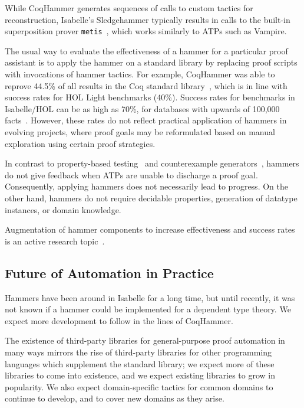 While CoqHammer generates sequences of calls to custom tactics for reconstruction, Isabelle's Sledgehammer typically results in calls to the built-in superposition prover \lstinline{metis}~\citep{Blanchette2011}, which works similarly to ATPs such as Vampire.

The usual way to evaluate the effectiveness of a hammer for a particular proof assistant is to apply the hammer on a standard library by replacing proof scripts with invocations of hammer tactics. For example, CoqHammer was able to reprove 44.5\% of all results in the Coq standard library~\citep{Czajka2018}, which is in line with success rates for HOL Light benchmarks (40\%). Success rates for benchmarks in Isabelle/HOL can be as high as 70\%, for databases with upwards of 100,000 facts~\citep{Blanchette2016}. However, these rates do not reflect practical application of hammers in evolving projects, where proof goals may be reformulated based on manual exploration using certain proof strategies. 

In contrast to property-based testing~\citep{Paraskevopoulou2015} and counterexample generators~\citep{Blanchette2010}, hammers do not give feedback when ATPs are unable to discharge a proof goal. Consequently, applying hammers does not necessarily lead to progress. On the other hand, hammers do not require decidable properties, generation of datatype instances, or domain knowledge.

Augmentation of hammer components to increase effectiveness and success rates is an active research topic~\citep{Blanchette2016b,Wang2017,Peng2017}.

\subsection{Future of Automation in Practice}
\label{sec:autofuture}

Hammers have been around in Isabelle for a long time, but until recently,
it was not known if a hammer could be implemented for a dependent type theory.
We expect more development to follow in the lines of CoqHammer.

The existence of third-party libraries for general-purpose proof automation in many ways mirrors
the rise of third-party libraries for other programming languages which supplement
the standard library; we expect more of these libraries to come into existence, and we expect
existing libraries to grow in popularity.
We also expect domain-specific tactics for common domains to continue to
develop, and to cover new domains as they arise.    

